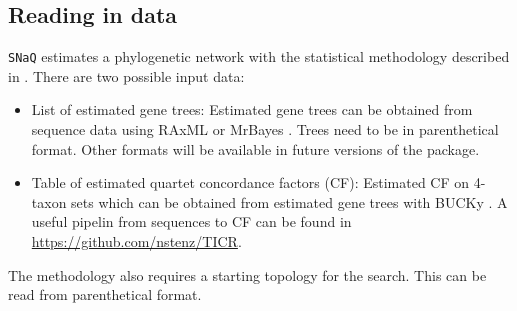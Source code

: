\documentclass[12pt]{article}
\begin{document}
\subsection{Reading in data}
\texttt{SNaQ} estimates a phylogenetic network with the statistical
methodology described in \citet{Solis-Lemus2015}. There are two possible
input data:
\begin{itemize}
\item{List of estimated gene trees: Estimated gene trees can be
    obtained from sequence data using RAxML \citep{raxmlv8} or
    MrBayes \citep{Huelsenbeck2001}. Trees need to be in parenthetical
    format. Other formats will be available in future versions of the
    package.}
\item{Table of estimated quartet concordance factors (CF): Estimated
    CF on 4-taxon sets which can be obtained from estimated gene trees
    with BUCKy \cite{Ane2007}. A useful pipelin from sequences to CF
    can be found in \url{https://github.com/nstenz/TICR}.}
\end{itemize}
The methodology also requires a starting topology for the search. This
can be read from parenthetical format.
\end{document}

